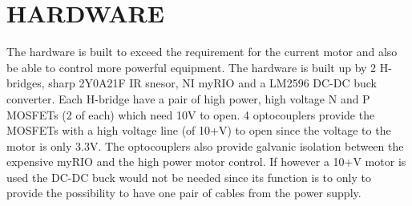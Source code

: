 \section{HARDWARE}
The hardware is built to exceed the requirement for the current motor and also be able to control more powerful equipment. \newline
The hardware is built up by 2 H-bridges, sharp 2Y0A21F IR snesor, NI myRIO and a LM2596 DC-DC buck converter. 
Each H-bridge have a pair of high power, high voltage N and P MOSFETs (2 of each) which need 10V to open. 4 optocouplers provide the MOSFETs with a high voltage line (of 10+V) to open since the voltage to the motor is only 3.3V. The optocouplers also provide galvanic isolation between the expensive myRIO and the high power motor control. If however a 10+V motor is used the DC-DC buck would not be needed since its function is to only to provide the possibility to have one pair of cables from the power supply. 